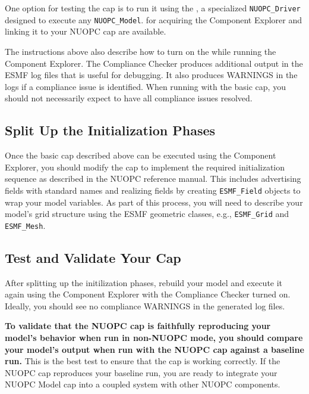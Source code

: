 One option for testing the cap is to run it using the , a specialized {\tt NUOPC\_Driver} designed to execute any {\tt NUOPC\_Model}.  
 for acquiring 
the Component Explorer and linking it to your NUOPC cap are available.

The instructions above also describe how to turn on the  while running the Component Explorer.  The
Compliance Checker produces additional output in the ESMF log
files that is useful for debugging.  It also produces WARNINGS
in the logs if a compliance issue is identified.  When running with
the basic cap, you should not necessarily expect to have all compliance issues
resolved.


\subsection{Split Up the Initialization Phases}
\label{sec:splitinit}
Once the basic cap described above can be executed using the Component Explorer,
you should modify the cap to implement the required initialization sequence
as described in the NUOPC reference manual. This
includes advertising fields with standard names and realizing fields by creating
{\tt ESMF\_Field} objects to wrap your model variables.  As part of this process,
you will need to describe your model's grid structure using the ESMF geometric
classes, e.g., {\tt ESMF\_Grid} and {\tt ESMF\_Mesh}.


\subsection{Test and Validate Your Cap}
\label{sec:validatecap}
After splitting up the initilization phases, rebuild your model and execute it again using
the Component Explorer with the Compliance Checker turned on.  Ideally, you
should see no compliance WARNINGS in the generated log files.

\textbf{To validate that the NUOPC cap is faithfully reproducing your model's
behavior when run in non-NUOPC mode, you should compare your model's
output when run with the NUOPC cap against a baseline run.}
This is the best test to ensure that the cap is working correctly.
If the NUOPC cap reproduces your baseline run, you are ready to integrate
your NUOPC Model cap into a coupled system with other NUOPC components.
